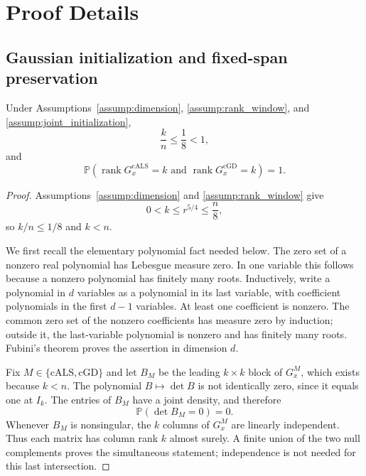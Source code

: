 \appendix

\section{Proof Details}

\subsection{Gaussian initialization and fixed-span preservation}\label{app:step-001}

\begin{lemma}\label{lem:step-001-full-rank}
Under Assumptions~\ref{assump:dimension}, \ref{assump:rank_window}, and
\ref{assump:joint_initialization},
\[
 \frac{k}{n}\le\frac18<1,
\]
and
\[
 \mathbb P\!\left(
 \operatorname{rank}G_x^{\mathrm{cALS}}=k
 \text{ and }
 \operatorname{rank}G_x^{\mathrm{cGD}}=k
 \right)=1.
\]
\end{lemma}

\begin{proof}
Assumptions~\ref{assump:dimension} and \ref{assump:rank_window} give
\[
 0<k\le r^{5/4}\le\frac n8,
\]
so $k/n\le1/8$ and $k<n$.

We first recall the elementary polynomial fact needed below.  The zero set of
a nonzero real polynomial has Lebesgue measure zero.  In one variable this
follows because a nonzero polynomial has finitely many roots.  Inductively,
write a polynomial in $d$ variables as a polynomial in its last variable,
with coefficient polynomials in the first $d-1$ variables.  At least one
coefficient is nonzero.  The common zero set of the nonzero coefficients has
measure zero by induction; outside it, the last-variable polynomial is
nonzero and has finitely many roots.  Fubini's theorem proves the assertion in
dimension $d$.

Fix $M\in\{\mathrm{cALS},\mathrm{cGD}\}$ and let $B_M$ be the leading
$k\times k$ block of $G_x^M$, which exists because $k<n$.  The polynomial
$B\mapsto\det B$ is not identically zero, since it equals one at $I_k$.
The entries of $B_M$ have a joint density, and therefore
\[
 \mathbb P(\det B_M=0)=0.
\]
Whenever $B_M$ is nonsingular, the $k$ columns of $G_x^M$ are linearly
independent.  Thus each matrix has column rank $k$ almost surely.  A finite
union of the two null complements proves the simultaneous statement;
independence is not needed for this last intersection.
\end{proof}

